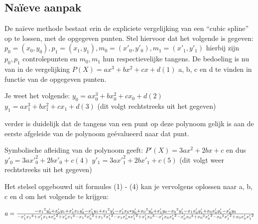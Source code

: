 \documentclass[a4paper,11pt,oneside, titlepage]{article}
\begin{document}
\subsection{Na\"ieve aanpak}
De na\"ieve methode bestaat erin de expliciete vergelijking van een ``cubic spline''
op te lossen, met de opgegeven punten.\newline
Stel hiervoor dat het volgende is gegeven:\newline
$p_0 = (x_0,y_0), p_1 = (x_1,y_1), m_0 = (x'_0, y'_0), m_1 = (x'_1, y'_1)$\newline
hierbij zijn $p_0,p_1$ controlepunten en $m_0, m_1$ hun respectievelijke tangens.\newline
\newline
De bedoeling is nu van in de vergelijking\newline
$P(X) = ax^3 + bx^2 + cx + d (1)$\newline
a, b, c en d te vinden in functie van de opgegeven punten.\newline

Je weet het volgende:
$y_0 = ax_0^3 + bx_0^2 + cx_0 + d (2)$\newline
$y_1 = ax_1^3 + bx_1^2 + cx_1 + d (3)$\newline
(dit volgt rechtstreeks uit het gegeven)\newline

verder is duidelijk dat de tangens van een punt op deze polynoom gelijk is aan de 
eerste afgeleide van de polynoom ge\'evalueerd naar dat punt.\newline

Symbolische afleiding van de polynoom geeft:
$P'(X) = 3ax^2 + 2bx + c$
en dus
$y'_0 = 3a{x'}_0^2 + 2bx'_0 + c (4)$\newline
$y'_1 = 3a{x'}_1^2 + 2bx'_1 + c (5)$\newline
(dit volgt weer rechtstreeks uit het gegeven)\newline

Het stelsel opgebouwd uit formules (1) - (4) kan je vervolgens oplossen naar a, b, c en d
om het volgende te krijgen:\newline

$a = {{{-{x_1}^2y'_0+x'_0y_1+x'_1x_1y'_0-x'_1y_1+{x_1}^2y'_1-x'_1x_0*y'_0+{x_0}^2y'_0+x'_1y_0-{x_0}^2y'_1-x_1x'_0y'_1+x_0x'_0y'_1-x'_0y_0}}\over{-x'_1{x_1}^3+x'_1x_1*{x'_0}^2+x'_0{x_1}^3-{x_1}^2{x'_0}^2+{x_1}^2{x'_1}^2-x_1x'_0*{x'_1}^2+x'_1{x_0}^3-x'_1x_0{x'_0}^2-x'_0{x_0}^3+{x_0}^2{x'_0}^2-{x_0}^2{x'_1}^2+x_0x'_0{x'_1}^2}}$\newline \newline
\end{document}
